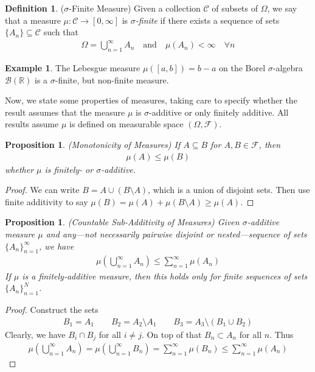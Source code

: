 \documentclass[12pt]{article}
\theoremstyle{plain}
\newtheorem{prop}[thm]{Proposition}
\theoremstyle{definition}
\newtheorem{defn}[thm]{Definition}
\newtheorem{ex}[thm]{Example}
\theoremstyle{remark}
\newcommand{\ra}{\rightarrow}
\newcommand{\sF}{\mathscr{F}}
\newcommand{\sB}{\mathscr{B}}
\newcommand{\sC}{\mathscr{C}}
\newcommand{\R}{\mathbb{R}}
\newcommand{\ninf}{_{n=1}^\infty}
\newcommand{\nN}{_{n=1}^N}
\begin{document}
\begin{defn}($\sigma$-Finite Measure)
Given a collection $\sC$ of subsets of $\Omega$,
we say that a measure $\mu:\sC\ra [0,\infty]$
is \emph{$\sigma$-finite} if there exists a sequence of sets
$\{A_n\}\subseteq \sC$ such that
\begin{align*}
  \Omega = \bigcup\ninf A_n
  \quad \text{and}\quad
  \mu(A_n)<\infty
  \quad\forall n
\end{align*}
\end{defn}

\begin{ex}
The Lebesgue measure $\mu([a,b])=b-a$ on the Borel $\sigma$-algebra
$\sB(\R)$ is a $\sigma$-finite, but non-finite measure.
\end{ex}


Now, we state some properties of measures, taking care to specify
whether the result assumes that the measure $\mu$ is $\sigma$-additive
or only finitely additive. All results assume $\mu$ is defined on
measurable space $(\Omega,\sF)$.

\begin{prop}\emph{(Monotonicity of Measures)}
If $A\subseteq B$ for $A,B\in\sF$, then
\begin{align*}
  \mu(A) \leq \mu(B)
\end{align*}
whether $\mu$ is finitely- or $\sigma$-additive.
\end{prop}
\begin{proof}
We can write $B = A \cup (B\setminus A)$, which is a union of disjoint
sets. Then use finite additivity to say $\mu(B) = \mu(A) +
\mu(B\setminus A) \geq \mu(A)$.
\end{proof}

\begin{prop}\emph{(Countable Sub-Additivity of Measures)}
Given $\sigma$-additive measure $\mu$ and \emph{any}---not necessarily
pairwise disjoint or nested---sequence of sets $\{A_n\}\ninf$, we have
\begin{align*}
  \mu\left(\bigcup^\infty_{n=1} A_n\right)
  \leq \sum\ninf \mu(A_n)
\end{align*}
If $\mu$ is a finitely-additive measure, then this holds only for finite
sequences of sets $\{A_n\}\nN$.
\end{prop}
\begin{proof}
Construct the sets
\begin{align*}
  B_1 = A_1 \qquad B_2 = A_2 \setminus A_1
  \qquad B_3 = A_3 \setminus (B_1 \cup B_2)
\end{align*}
Clearly, we have $B_i \cap B_j$ for all $i\neq j$. On top of that $B_n
\subset A_n$ for all $n$. Thus
\begin{align*}
  \mu\left(\bigcup^\infty_{n=1} A_n\right)
  = \mu\left(\bigcup^\infty_{n=1} B_n\right)
  = \sum\ninf \mu(B_n)
  \leq \sum\ninf \mu(A_n)
\end{align*}
\end{proof}
\end{document}

